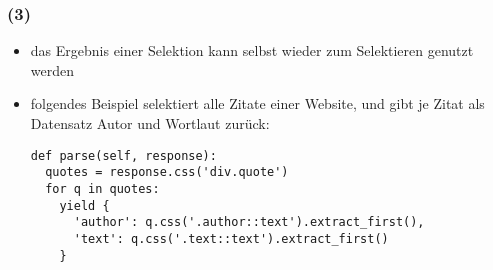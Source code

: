\documentclass{beamer}
\begin{document}
\begin{frame}[fragile]
	\frametitle{\insertsection{} (3)}
	\begin{itemize}
		\item das Ergebnis einer Selektion kann selbst wieder zum Selektieren genutzt werden
		\item folgendes Beispiel selektiert alle Zitate einer Website, und gibt je Zitat als Datensatz Autor und Wortlaut zurück:
	\begin{lstlisting}
def parse(self, response):
  quotes = response.css('div.quote')
  for q in quotes:
    yield {
      'author': q.css('.author::text').extract_first(),
      'text': q.css('.text::text').extract_first()
    }
	\end{lstlisting}
	\end{itemize}
\end{frame}

	
\end{document}
